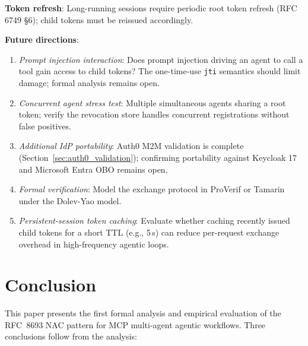 \documentclass[journal]{IEEEtran}
\begin{document}
\textbf{Token refresh}: Long-running sessions require periodic root token refresh
(RFC 6749 §6); child tokens must be reissued accordingly.

\textbf{Future directions}:
\begin{enumerate}
  \item \textit{Prompt injection interaction}: Does prompt injection driving an
        agent to call a tool gain access to child tokens? The one-time-use
        \texttt{jti} semantics should limit damage; formal analysis remains open.
  \item \textit{Concurrent agent stress test}: Multiple simultaneous agents
        sharing a root token; verify the revocation store handles concurrent
        registrations without false positives.
  \item \textit{Additional IdP portability}: Auth0 M2M validation is complete
        (Section~\ref{sec:auth0_validation}); confirming portability against
        Keycloak 17 and Microsoft Entra OBO remains open.
  \item \textit{Formal verification}: Model the exchange protocol in ProVerif
        \cite{blanchet2001} or Tamarin \cite{meier2013} under the Dolev-Yao
        model.
  \item \textit{Persistent-session token caching}: Evaluate whether caching
        recently issued child tokens for a short TTL (e.g., 5\,s) can reduce
        per-request exchange overhead in high-frequency agentic loops.
\end{enumerate}


\FloatBarrier  %

\section{Conclusion}
\label{sec:conclusion}

This paper presents the first formal analysis and empirical evaluation of the
RFC~8693 NAC pattern for MCP multi-agent agentic workflows. Three conclusions
follow from the analysis:
\end{document}
